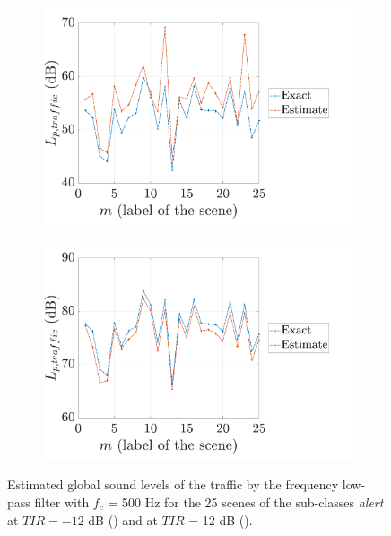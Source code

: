 \documentclass[twocolumn,a4paper,10pt]{article}
\begin{document}
\begin{figure}[t]
    \centering
    \begin{subfigure}[t]{0.45\textwidth}
        \centering
        \includegraphics[width=\linewidth]{figures/LeqTrafficComparison_filter_alert_-12.pdf}
        \caption{}
        \label{fig:alert_-12}
    \end{subfigure}%
    \hfill
    \begin{subfigure}[t]{0.45\textwidth}
        \centering
        \includegraphics[width=\linewidth]{figures/LeqTrafficComparison_filter_alert_12.pdf}
        \caption{}
        \label{fig:alert_12}
    \end{subfigure}

    \caption{Estimated global sound levels of the traffic by the frequency low-pass filter with $f_c$ = 500 Hz for the 25 scenes of the sub-classes \textit{alert} at $TIR = -12$ dB () and at $TIR$ = 12 dB ().}
    \label{fig:dictionaryExtraction}
\end{figure}
\end{document}
